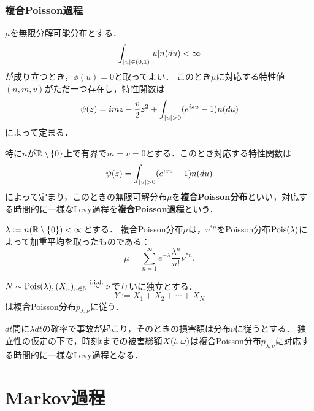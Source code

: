 \documentclass[uplatex,dvipdfmx]{jsreport}
\begin{document}
\subsection{複合Poisson過程}

\begin{discussion}
    $\mu$を無限分解可能分布とする．
    \[\int_{\lvert u\rvert\in(0,1)}\lvert u\rvert n(du)<\infty\]
    が成り立つとき，$\phi(u)=0$と取ってよい．
    このとき$\mu$に対応する特性値$(n,m,v)$がただ一つ存在し，特性関数は
    \[\psi(z)=imz-\frac{v}{2}z^2+\int_{\lvert u\rvert>0}(e^{izu}-1)n(du)\]
    によって定まる．
\end{discussion}

\begin{definition}
    特に$n$が$\mathbb{R}\setminus\{0\}$上で有界で$m=v=0$とする．このとき対応する特性関数は
    \[\psi(z)=\int_{\lvert u\rvert>0}(e^{izu}-1)n(du)\]
    によって定まり，このときの無限可解分布$\mu$を\textbf{複合Poisson分布}といい，対応する時間的に一様なLevy過程を\textbf{複合Poisson過程}という．
\end{definition}

\begin{lemma}[複合Poisson分布の特徴付け]
    $\lambda:=n(\mathbb{R}\setminus\{0\})<\infty$とする．
    複合Poisson分布$\mu$は，$v^{*n}$をPoisson分布$\mathrm{Pois}(\lambda)$によって加重平均を取ったものである：
    \[\mu=\sum^\infty_{n=1}e^{-\lambda}\frac{\lambda^n}{n!}\nu^{*n}.\]
\end{lemma}

\begin{proposition}
    $N\sim\mathrm{Pois}(\lambda),(X_n)_{n\in\mathbb{N}}\overset{\mathrm{i.i.d.}}{\sim}\nu$で互いに独立とする．
    \[Y:=X_1+X_2+\cdots+X_N\]
    は複合Poisson分布$p_{\lambda,\nu}$に従う．
\end{proposition}
\begin{remarks}
    $dt$間に$\lambda dt$の確率で事故が起こり，そのときの損害額は分布$\nu$に従うとする．
    独立性の仮定の下で，時刻$t$までの被害総額$X(t,\omega)$は複合Poisson分布$p_{\lambda,\nu}$に対応する時間的に一様なLevy過程となる．
\end{remarks}

\chapter{Markov過程}
\end{document}
